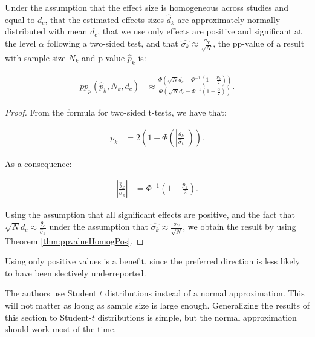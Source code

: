 \documentclass[]{book}
\theoremstyle{definition}
\theoremstyle{definition}
\theoremstyle{definition}
\theoremstyle{remark}
\let\BeginKnitrBlock\begin \let\EndKnitrBlock\end
\begin{document}
\BeginKnitrBlock{corollary}[Building pp-value from p-values]
\protect\hypertarget{cor:pppvalueHomogPos}{}{\label{cor:pppvalueHomogPos} \iffalse (Building pp-value from p-values) \fi{} }Under the assumption that the effect size is homogeneous across studies and equal to \(d_c\), that the estimated effects sizes \(\hat{d}_k\) are approximately normally distributed with mean \(d_c\), that we use only effects are positive and significant at the level \(\alpha\) following a two-sided test, and that \(\hat{\sigma_k}\approx\frac{\sigma_{Y}}{\sqrt{N}}\), the pp-value of a result with sample size \(N_k\) and p-value \(\hat{p}_k\) is:

\begin{align*}
  pp_p(\hat{p}_k,N_k,d_c) & \approx \frac{\Phi\left(\sqrt{N}d_c-\Phi^{-1}\left(1-\frac{p_k}{2}\right)\right)}
                                        {\Phi\left(\sqrt{N}d_c-\Phi^{-1}\left(1-\frac{\alpha}{2}\right)\right)}.
 \end{align*}
\EndKnitrBlock{corollary}

\BeginKnitrBlock{proof}
\iffalse{} {Proof. } \fi{}From the formula for two-sided t-tests, we have that:

\begin{align*}
  p_k & = 2\left(1-\Phi\left(\left|\frac{\hat{\theta}_k}{\hat{\sigma}_k}\right|\right)\right).
\end{align*}

As a consequence:

\begin{align*}
  \left|\frac{\hat{\theta}_k}{\hat{\sigma}_k}\right| & = \Phi^{-1}\left(1-\frac{p_k}{2}\right).
\end{align*}

Using the assumption that all significant effects are positive, and the fact that \(\sqrt{N}d_c\approx\frac{\theta_c}{\hat{\sigma}_k}\) under the assumption that \(\hat{\sigma_k}\approx\frac{\sigma_{Y}}{\sqrt{N}}\), we obtain the result by using Theorem \ref{thm:ppvalueHomogPos}.
\EndKnitrBlock{proof}

\BeginKnitrBlock{remark}
\iffalse{} {Remark. } \fi{}Using only positive values is a benefit, since the preferred direction is less likely to have been slectively underreported.
\EndKnitrBlock{remark}

\BeginKnitrBlock{remark}
\iffalse{} {Remark. } \fi{}The authors use Student \(t\) distributions instead of a normal approximation.
This will not matter as loong as sample size is large enough.
Generalizing the results of this section to Student-\(t\) distributions is simple, but the normal approximation should work most of the time.
\EndKnitrBlock{remark}
\end{document}
